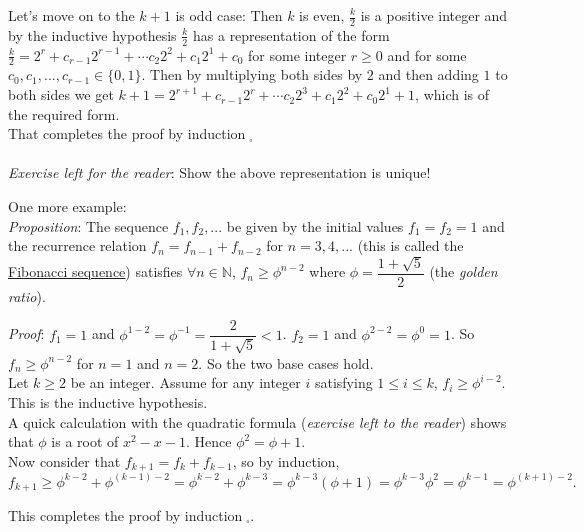 \documentclass[12pt]{amsart}
\theoremstyle{definition}
\theoremstyle{remark}
\newcommand{\nats}{\mathbb N}
\begin{document}
Let's move on to the $k+1$ is odd case:  Then $k$ is even, $\displaystyle \frac{k}{2}$ is a positive integer and by the inductive hypothesis $\displaystyle \frac{k}{2}$ has a representation of the form $\displaystyle \frac{k}{2}=2^r+c_{r-1}2^{r-1}+\cdots c_2 2^2+c_1 2^1+c_0$ for some integer $r\geq 0$ and for some $c_0,c_1,...,c_{r-1}\in\{0,1\}$.  Then by multiplying both sides by $2$ and then adding $1$ to both sides we get $k+1=2^{r+1}+c_{r-1}2^{r}+\cdots c_2 2^3+c_1 2^2+c_0 2^1+1$, which is of the required form.\\

That completes the proof by induction$\;_{\square}$\\ \\

\emph{Exercise left for the reader}:  Show the above representation is unique!

\newpage
One more example:\\

\emph{Proposition}:  The sequence $f_{1},f_{2},...$ be given by the initial values $f_{1}=f_{2}=1$ and the recurrence relation $f_{n}=f_{n-1}+f_{n-2}$ for $n=3,4,...$ (this is called the \underline{Fibonacci sequence}) satisfies  $\forall n\in\nats$, $f_{n}\geq \phi^{n-2}$ where $\phi=\dfrac{1+\sqrt{5}}{2}$ (the \emph{golden ratio}).

\bigskip

\emph{Proof}:  $f_{1}=1$ and $\phi^{1-2}=\phi^{-1} =\dfrac{2}{1+\sqrt{5}}<1$.  $f_{2}=1$ and $\phi^{2-2}=\phi^{0}=1$.  So $f_{n}\geq \phi^{n-2}$ for $n=1$ and $n=2$.  So the two base cases hold.\\

Let $k\geq 2$ be an integer.  Assume for any integer $i$ satisfying $1\leq i\leq k$, $f_{i}\geq \phi^{i-2}$.  This is the inductive hypothesis.\\

A quick calculation with the quadratic formula (\emph{exercise left to the reader}) shows that $\phi$ is a root of $x^{2}-x-1$.  Hence $\phi^{2}=\phi+1$.\\


Now consider that $f_{k+1}=f_{k}+f_{k-1}$, so by induction, $$f_{k+1}\geq \phi^{k-2}+\phi^{(k-1)-2}=\phi^{k-2}+\phi^{k-3}=\phi^{k-3}\left(\phi+1\right)=\phi^{k-3}\phi^{2}=\phi^{k-1}=\phi^{(k+1)-2}.$$


This completes the proof by induction$\;_{\square}$.
\end{document}
